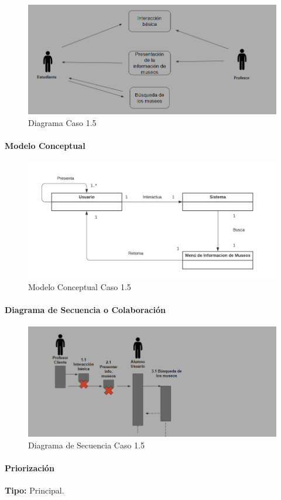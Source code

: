 \begin{figure}[H]
\centerline{\includegraphics[width=15cm]{imgs/CasoUso_5.PNG}}
\caption{Diagrama Caso 1.5}
\label{fig_5_1}
\end{figure}

\paragraph{Modelo Conceptual}

\begin{figure}[H]
\centerline{\includegraphics[width=15cm]{imgs/ModeloConceptualCaso_5_3.png}}
\caption{Modelo Conceptual Caso 1.5}
\label{fig_5_2}
\end{figure}

\paragraph{Diagrama de Secuencia o Colaboración}

\begin{figure}[H]
\centerline{\includegraphics[width=15cm]{imgs/CasoUso_5_2.PNG}}
\caption{Diagrama de Secuencia Caso 1.5}
\label{fig_5_3}
\end{figure}

\paragraph{Priorización}
{\textbf {Tipo:}}
Principal.
